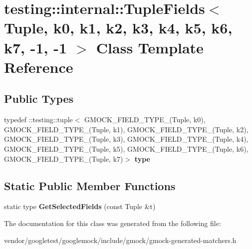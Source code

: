 \hypertarget{classtesting_1_1internal_1_1_tuple_fields_3_01_tuple_00_01k0_00_01k1_00_01k2_00_01k3_00_01k4_00_cda35487ca7d3bd5a9557919642ae14b}{}\section{testing\+:\+:internal\+:\+:Tuple\+Fields$<$ Tuple, k0, k1, k2, k3, k4, k5, k6, k7, -\/1, -\/1 $>$ Class Template Reference}
\label{classtesting_1_1internal_1_1_tuple_fields_3_01_tuple_00_01k0_00_01k1_00_01k2_00_01k3_00_01k4_00_cda35487ca7d3bd5a9557919642ae14b}
\subsection*{Public Types}
\begin{DoxyCompactItemize}
\item 
\mbox{\label{classtesting_1_1internal_1_1_tuple_fields_3_01_tuple_00_01k0_00_01k1_00_01k2_00_01k3_00_01k4_00_cda35487ca7d3bd5a9557919642ae14b_a4ca1e3e9805d5f38ac371529b67496d2}} 
typedef \+::testing\+::tuple$<$ G\+M\+O\+C\+K\+\_\+\+F\+I\+E\+L\+D\+\_\+\+T\+Y\+P\+E\+\_\+(Tuple, k0), G\+M\+O\+C\+K\+\_\+\+F\+I\+E\+L\+D\+\_\+\+T\+Y\+P\+E\+\_\+(Tuple, k1), G\+M\+O\+C\+K\+\_\+\+F\+I\+E\+L\+D\+\_\+\+T\+Y\+P\+E\+\_\+(Tuple, k2), G\+M\+O\+C\+K\+\_\+\+F\+I\+E\+L\+D\+\_\+\+T\+Y\+P\+E\+\_\+(Tuple, k3), G\+M\+O\+C\+K\+\_\+\+F\+I\+E\+L\+D\+\_\+\+T\+Y\+P\+E\+\_\+(Tuple, k4), G\+M\+O\+C\+K\+\_\+\+F\+I\+E\+L\+D\+\_\+\+T\+Y\+P\+E\+\_\+(Tuple, k5), G\+M\+O\+C\+K\+\_\+\+F\+I\+E\+L\+D\+\_\+\+T\+Y\+P\+E\+\_\+(Tuple, k6), G\+M\+O\+C\+K\+\_\+\+F\+I\+E\+L\+D\+\_\+\+T\+Y\+P\+E\+\_\+(Tuple, k7)$>$ {\bfseries type}
\end{DoxyCompactItemize}
\subsection*{Static Public Member Functions}
\begin{DoxyCompactItemize}
\item 
\mbox{\label{classtesting_1_1internal_1_1_tuple_fields_3_01_tuple_00_01k0_00_01k1_00_01k2_00_01k3_00_01k4_00_cda35487ca7d3bd5a9557919642ae14b_a51eb7795e93b4a6be753d5891da04b9f}} 
static type {\bfseries Get\+Selected\+Fields} (const Tuple \&t)
\end{DoxyCompactItemize}


The documentation for this class was generated from the following file\+:\begin{DoxyCompactItemize}
\item 
vendor/googletest/googlemock/include/gmock/gmock-\/generated-\/matchers.\+h\end{DoxyCompactItemize}
